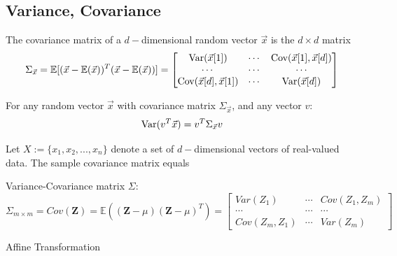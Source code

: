 \documentclass[11pt]{elegantbook}
\begin{document}
\subsection{Variance, Covariance}
\begin{definition}
    The covariance matrix of a $d-$dimensional random vector $\vec{x}$ is the $d\times d$ matrix
    \begin{equation}
        \begin{aligned}
            \Sigma_{\vec{x}}=\mathbb{E}[(\vec{x}-\mathbb{E}(\vec{x}))^T(\vec{x}-\mathbb{E}(\vec{x}))]=\begin{bmatrix}
                \textnormal{Var}(\vec{x}[1])&\cdots	&\textnormal{Cov}(\vec{x}[1],\vec{x}[d])\\
                \cdots&\cdots	&\cdots\\
                \textnormal{Cov}(\vec{x}[d],\vec{x}[1])&\cdots &\textnormal{Var}(\vec{x}[d])
            \end{bmatrix}
        \end{aligned}
        \nonumber
    \end{equation}
\end{definition}
\begin{lemma}
    For any random vector $\vec{x}$ with covariance matrix $\Sigma_{\vec{x}}$, and any vector $v$:
    \begin{equation}
        \begin{aligned}
            \textnormal{Var}(v^T \vec{x})= v^T\Sigma_{\vec{x}}v
        \end{aligned}
        \nonumber
    \end{equation}
\end{lemma}

\begin{definition}
    Let $X := \{x_1, x_2,..., x_n\}$ denote a set of $d-$dimensional vectors of real-valued data. The sample covariance matrix equals
\end{definition}

Variance-Covariance matrix $\Sigma$:
$$\Sigma_{m\times m}=Cov(\mathbf{Z})=\mathbb{E}((\mathbf{Z}-\mu)(\mathbf{Z}-\mu)^T)=\begin{bmatrix}
    Var(Z_1)&\cdots	&Cov(Z_1,Z_m)\\
    \cdots&\cdots	&\cdots\\
    Cov(Z_m,Z_1)&\cdots &Var(Z_m)
\end{bmatrix}$$

Affine Transformation
\end{document}
